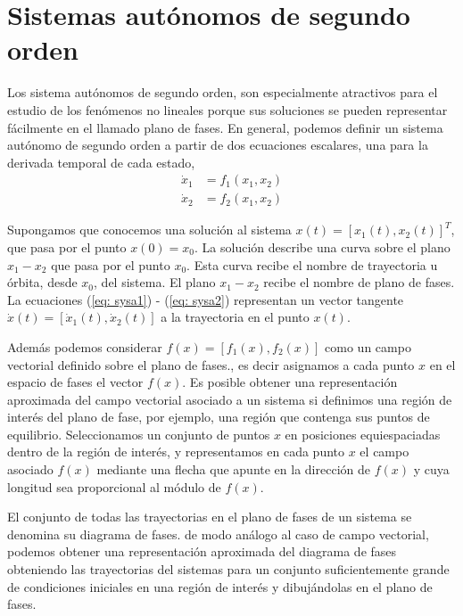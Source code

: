 \section{Sistemas autónomos de segundo orden}
Los sistema autónomos de segundo orden, son especialmente atractivos para el estudio de los fenómenos no lineales porque sus soluciones se pueden representar fácilmente en el llamado plano de fases.
En general, podemos definir un sistema autónomo de segundo orden a partir de dos ecuaciones escalares, una para la derivada temporal de cada estado,
\begin{align}
\dot x_1 &= f_1(x_1,x_2) \label{eq: sysa1}\\
\dot x_2 &= f_2(x_1,x_2) \label{eq: sysa2}
\end{align}

Supongamos que conocemos una solución al sistema $x(t) = [x_1(t),x_2(t)]^T$, que pasa por el punto $x(0) = x_0$. La solución describe una curva sobre el plano $x_1-x_2$ que pasa por el punto $x_0$. Esta curva recibe el nombre de trayectoria u órbita, desde $x_0$, del sistema. El plano $x_1-x_2$ recibe el nombre de plano de fases. La ecuaciones (\ref{eq: sysa1}) - (\ref{eq: sysa2}) representan un vector tangente $\dot x(t) = [\dot x_1(t),\dot x_2(t)]$ a la trayectoria en el punto $x(t)$.

Además podemos considerar $f(x)=[f_1(x),f_2(x)]$ como un campo vectorial definido sobre el plano de fases., es decir asignamos a cada punto $x$ en el espacio de fases el vector $f(x)$. Es posible obtener una representación aproximada del campo vectorial asociado a un sistema si definimos una región de interés del plano de fase, por ejemplo, una región que contenga sus puntos de equilibrio. Seleccionamos un conjunto de puntos $x$ en posiciones equiespaciadas dentro de la región de interés, y representamos en cada punto $x$ el campo asociado $f(x)$ mediante una flecha que apunte en la dirección de $f(x)$ y cuya longitud sea proporcional al módulo de $f(x)$.

El conjunto de todas las trayectorias en el plano de fases de un sistema se denomina su diagrama de fases. de modo análogo al caso de campo vectorial, podemos obtener una representación aproximada del diagrama de fases obteniendo las trayectorias del sistemas para un conjunto suficientemente grande de condiciones iniciales en una región de interés y dibujándolas en el plano de fases.


